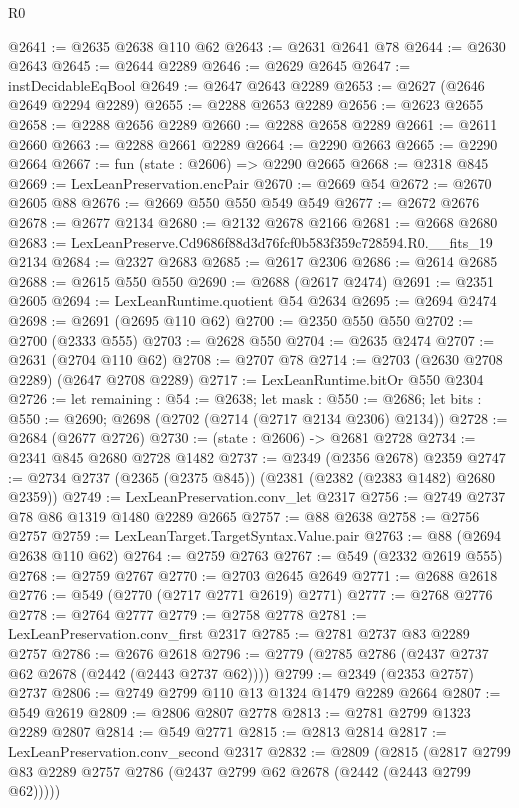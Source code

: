 \begin{lexlean}{R0}
\begin{coremodule}
@2641 := @2635 @2638 @110 @62
@2643 := @2631 @2641 @78
@2644 := @2630 @2643
@2645 := @2644 @2289
@2646 := @2629 @2645
@2647 := instDecidableEqBool
@2649 := @2647 @2643 @2289
@2653 := @2627 (@2646 @2649 @2294 @2289)
@2655 := @2288 @2653 @2289
@2656 := @2623 @2655
@2658 := @2288 @2656 @2289
@2660 := @2288 @2658 @2289
@2661 := @2611 @2660
@2663 := @2288 @2661 @2289
@2664 := @2290 @2663
@2665 := @2290 @2664
@2667 := fun (state : @2606) => @2290 @2665
@2668 := @2318 @845
@2669 := LexLeanPreservation.encPair
@2670 := @2669 @54
@2672 := @2670 @2605 @88
@2676 := @2669 @550 @550 @549 @549
@2677 := @2672 @2676
@2678 := @2677 @2134
@2680 := @2132 @2678 @2166
@2681 := @2668 @2680
@2683 := LexLeanPreserve.Cd9686f88d3d76fcf0b583f359c728594.R0.__fits_19 @2134
@2684 := @2327 @2683
@2685 := @2617 @2306
@2686 := @2614 @2685
@2688 := @2615 @550 @550
@2690 := @2688 (@2617 @2474)
@2691 := @2351 @2605
@2694 := LexLeanRuntime.quotient @54 @2634
@2695 := @2694 @2474
@2698 := @2691 (@2695 @110 @62)
@2700 := @2350 @550 @550
@2702 := @2700 (@2333 @555)
@2703 := @2628 @550
@2704 := @2635 @2474
@2707 := @2631 (@2704 @110 @62)
@2708 := @2707 @78
@2714 := @2703 (@2630 @2708 @2289) (@2647 @2708 @2289)
@2717 := LexLeanRuntime.bitOr @550 @2304
@2726 := let remaining : @54 := @2638;
  let mask : @550 := @2686;
  let bits : @550 := @2690; @2698 (@2702 (@2714 (@2717 @2134 @2306) @2134))
@2728 := @2684 (@2677 @2726)
@2730 := (state : @2606) -> @2681 @2728
@2734 := @2341 @845 @2680 @2728 @1482
@2737 := @2349 (@2356 @2678) @2359
@2747 := @2734 @2737 (@2365 (@2375 @845)) (@2381 (@2382 (@2383 @1482) @2680 @2359))
@2749 := LexLeanPreservation.conv_let @2317
@2756 := @2749 @2737 @78 @86 @1319 @1480 @2289 @2665
@2757 := @88 @2638
@2758 := @2756 @2757
@2759 := LexLeanTarget.TargetSyntax.Value.pair
@2763 := @88 (@2694 @2638 @110 @62)
@2764 := @2759 @2763
@2767 := @549 (@2332 @2619 @555)
@2768 := @2759 @2767
@2770 := @2703 @2645 @2649
@2771 := @2688 @2618
@2776 := @549 (@2770 (@2717 @2771 @2619) @2771)
@2777 := @2768 @2776
@2778 := @2764 @2777
@2779 := @2758 @2778
@2781 := LexLeanPreservation.conv_first @2317
@2785 := @2781 @2737 @83 @2289 @2757
@2786 := @2676 @2618
@2796 := @2779 (@2785 @2786 (@2437 @2737 @62 @2678 (@2442 (@2443 @2737 @62))))
@2799 := @2349 (@2353 @2757) @2737
@2806 := @2749 @2799 @110 @13 @1324 @1479 @2289 @2664
@2807 := @549 @2619
@2809 := @2806 @2807 @2778
@2813 := @2781 @2799 @1323 @2289 @2807
@2814 := @549 @2771
@2815 := @2813 @2814
@2817 := LexLeanPreservation.conv_second @2317
@2832 := @2809
    (@2815 (@2817 @2799 @83 @2289 @2757 @2786 (@2437 @2799 @62 @2678 (@2442 (@2443 @2799 @62)))))

\end{coremodule}
\end{lexlean}
